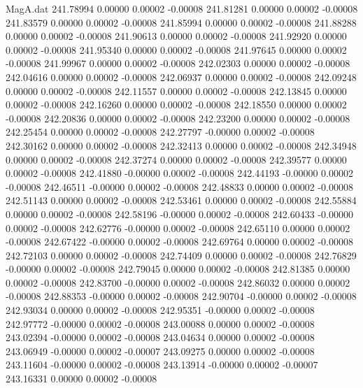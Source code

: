 \begin{filecontents}{MagA.dat}
 241.78994    0.00000    0.00002   -0.00008
 241.81281    0.00000    0.00002   -0.00008
 241.83579    0.00000    0.00002   -0.00008
 241.85994    0.00000    0.00002   -0.00008
 241.88288    0.00000    0.00002   -0.00008
 241.90613    0.00000    0.00002   -0.00008
 241.92920    0.00000    0.00002   -0.00008
 241.95340    0.00000    0.00002   -0.00008
 241.97645    0.00000    0.00002   -0.00008
 241.99967    0.00000    0.00002   -0.00008
 242.02303    0.00000    0.00002   -0.00008
 242.04616    0.00000    0.00002   -0.00008
 242.06937    0.00000    0.00002   -0.00008
 242.09248    0.00000    0.00002   -0.00008
 242.11557    0.00000    0.00002   -0.00008
 242.13845    0.00000    0.00002   -0.00008
 242.16260    0.00000    0.00002   -0.00008
 242.18550    0.00000    0.00002   -0.00008
 242.20836    0.00000    0.00002   -0.00008
 242.23200    0.00000    0.00002   -0.00008
 242.25454    0.00000    0.00002   -0.00008
 242.27797   -0.00000    0.00002   -0.00008
 242.30162    0.00000    0.00002   -0.00008
 242.32413    0.00000    0.00002   -0.00008
 242.34948    0.00000    0.00002   -0.00008
 242.37274    0.00000    0.00002   -0.00008
 242.39577    0.00000    0.00002   -0.00008
 242.41880   -0.00000    0.00002   -0.00008
 242.44193   -0.00000    0.00002   -0.00008
 242.46511   -0.00000    0.00002   -0.00008
 242.48833    0.00000    0.00002   -0.00008
 242.51143    0.00000    0.00002   -0.00008
 242.53461    0.00000    0.00002   -0.00008
 242.55884    0.00000    0.00002   -0.00008
 242.58196   -0.00000    0.00002   -0.00008
 242.60433   -0.00000    0.00002   -0.00008
 242.62776   -0.00000    0.00002   -0.00008
 242.65110    0.00000    0.00002   -0.00008
 242.67422   -0.00000    0.00002   -0.00008
 242.69764    0.00000    0.00002   -0.00008
 242.72103    0.00000    0.00002   -0.00008
 242.74409    0.00000    0.00002   -0.00008
 242.76829   -0.00000    0.00002   -0.00008
 242.79045    0.00000    0.00002   -0.00008
 242.81385    0.00000    0.00002   -0.00008
 242.83700   -0.00000    0.00002   -0.00008
 242.86032    0.00000    0.00002   -0.00008
 242.88353   -0.00000    0.00002   -0.00008
 242.90704   -0.00000    0.00002   -0.00008
 242.93034    0.00000    0.00002   -0.00008
 242.95351   -0.00000    0.00002   -0.00008
 242.97772   -0.00000    0.00002   -0.00008
 243.00088    0.00000    0.00002   -0.00008
 243.02394   -0.00000    0.00002   -0.00008
 243.04634    0.00000    0.00002   -0.00008
 243.06949   -0.00000    0.00002   -0.00007
 243.09275    0.00000    0.00002   -0.00008
 243.11604   -0.00000    0.00002   -0.00008
 243.13914   -0.00000    0.00002   -0.00007
 243.16331    0.00000    0.00002   -0.00008

\end{filecontents}
